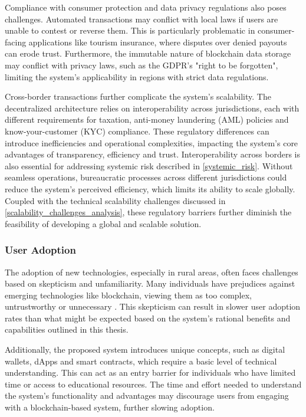 Compliance with consumer protection and data privacy regulations also poses challenges. Automated transactions may conflict with local laws if users are unable to contest or reverse them. This is particularly problematic in consumer-facing applications like tourism insurance, where disputes over denied payouts can erode trust. Furthermore, the immutable nature of blockchain data storage may conflict with privacy laws, such as the GDPR's "right to be forgotten", limiting the system's applicability in regions with strict data regulations.

Cross-border transactions further complicate the system's scalability. The decentralized architecture relies on interoperability across jurisdictions, each with different requirements for taxation, anti-money laundering (AML) policies and know-your-customer (KYC) compliance. These regulatory differences can introduce inefficiencies and operational complexities, impacting the system's core advantages of transparency, efficiency and trust. Interoperability across borders is also essential for addressing systemic risk described in \cref{systemic_risk}. Without seamless operations, bureaucratic processes across different jurisdictions could reduce the system's perceived efficiency, which limits its ability to scale globally. Coupled with the technical scalability challenges discussed in \cref{scalability_challenges_analysis}, these regulatory barriers further diminish the feasibility of developing a global and scalable solution.

\subsubsection{User Adoption}
The adoption of new technologies, especially in rural areas, often faces challenges based on skepticism and unfamiliarity. Many individuals have prejudices against emerging technologies like blockchain, viewing them as too complex, untrustworthy or unnecessary \autocite{Alabdali2023Influential}. This skepticism can result in slower user adoption rates than what might be expected based on the system's rational benefits and capabilities outlined in this thesis.

Additionally, the proposed system introduces unique concepts, such as digital wallets, dApps and smart contracts, which require a basic level of technical understanding. This can act as an entry barrier for individuals who have limited time or access to educational resources. The time and effort needed to understand the system's functionality and advantages may discourage users from engaging with a blockchain-based system, further slowing adoption.

